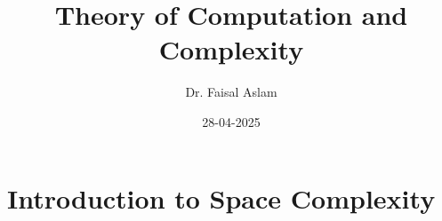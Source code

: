 \documentclass{report}
\title{Theory of Computation and Complexity}
\author{Dr. Faisal Aslam}
\date{28-04-2025}
\begin{document}
\maketitle

\tableofcontents  %

\chapter{Introduction to Space Complexity}
\end{document}
